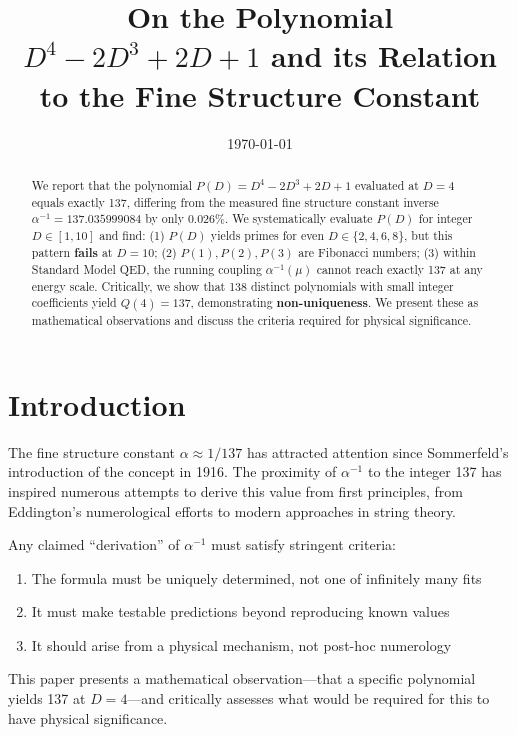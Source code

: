 \documentclass[11pt,a4paper]{article}
\title{On the Polynomial $D^4 - 2D^3 + 2D + 1$ and its Relation to the Fine Structure Constant}
\author{}
\date{\today}
\begin{document}
\maketitle

\begin{abstract}
We report that the polynomial $P(D) = D^4 - 2D^3 + 2D + 1$ evaluated at $D=4$ equals exactly 137, differing from the measured fine structure constant inverse $\alpha^{-1} = 137.035999084$ by only 0.026\%. We systematically evaluate $P(D)$ for integer $D \in [1,10]$ and find: (1) $P(D)$ yields primes for even $D \in \{2,4,6,8\}$, but this pattern \textbf{fails} at $D=10$; (2) $P(1), P(2), P(3)$ are Fibonacci numbers; (3) within Standard Model QED, the running coupling $\alpha^{-1}(\mu)$ cannot reach exactly 137 at any energy scale. Critically, we show that 138 distinct polynomials with small integer coefficients yield $Q(4) = 137$, demonstrating \textbf{non-uniqueness}. We present these as mathematical observations and discuss the criteria required for physical significance.
\end{abstract}

\section{Introduction}

The fine structure constant $\alpha \approx 1/137$ has attracted attention since Sommerfeld's introduction of the concept in 1916. The proximity of $\alpha^{-1}$ to the integer 137 has inspired numerous attempts to derive this value from first principles, from Eddington's numerological efforts to modern approaches in string theory.

Any claimed ``derivation'' of $\alpha^{-1}$ must satisfy stringent criteria:
\begin{enumerate}
    \item The formula must be uniquely determined, not one of infinitely many fits
    \item It must make testable predictions beyond reproducing known values
    \item It should arise from a physical mechanism, not post-hoc numerology
\end{enumerate}

This paper presents a mathematical observation---that a specific polynomial yields 137 at $D=4$---and critically assesses what would be required for this to have physical significance.
\end{document}

